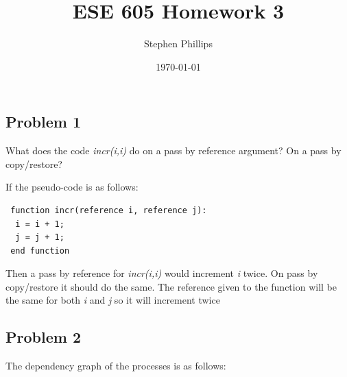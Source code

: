 \documentclass[english]{article}
\title{ESE 605 Homework 3}
\author{Stephen Phillips}
\date{\today }
\begin{document}
\maketitle
\subsection*{Problem 1}
What does the code \textit{incr(i,i)} do on a pass by reference argument? On a pass by copy/restore?

If the pseudo-code is as follows:
\begin{lstlisting}
 function incr(reference i, reference j):
  i = i + 1;
  j = j + 1;
 end function
\end{lstlisting}

Then a pass by reference for \textit{incr(i,i)} would increment \textit{i} twice. %
On pass by copy/restore it should do the same. The reference given to the function will be the same for both \textit{i} and \textit{j} so it will increment twice


\subsection*{Problem 2}
The dependency graph of the processes is as follows:
\begin{figure}[h!]
\end{figure}
\end{document}
